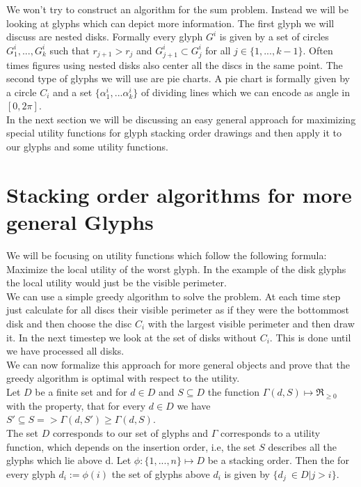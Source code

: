 \documentclass[a4paper,11pt]{article}
\begin{document}
We won't try to construct an algorithm for the sum problem. Instead we will be looking at glyphs which can depict more information. The first glyph we will discuss are nested disks. Formally every glyph $G^i$ is given by a set of circles $G^i_1,...,G^i_k$ such that $r_{j+1}>r_j$ and $G^i_{j+1}\subset G^i_j$ for all $j\in \{1,...,k-1 \}$. Often times figures using nested disks also center all the discs in the same point. The second type of glyphs we will use are pie charts. A pie chart is formally given by a circle $C_i$ and a set $\{\alpha_1^i,...\alpha_k^i\}$ of dividing lines which we can encode as angle in $[0,2\pi ]$.\\
In the next section we will be discussing an easy general approach for maximizing special utility functions for glyph stacking order drawings and then apply it to our glyphs and some utility functions.

\section{Stacking order algorithms for more general Glyphs}

We will be focusing on utility functions which follow the following formula: Maximize the local utility of the worst glyph. In the example of the disk glyphs the local utility would just be the visible perimeter. \\We can use a simple greedy algorithm to solve the problem. At each time step just calculate for all discs their visible perimeter as if they were the bottommost disk and then choose the disc $C_i$ with the largest visible perimeter and then draw it. In the next timestep we look at the set of disks without $C_i$. This is done until we have processed all disks.\\

We can now formalize this approach for more general objects and prove that the greedy algorithm is optimal with respect to the utility.
\\

Let $D$ be a finite set and for $d \in D$ and $S \subseteq D$ the function $ \Gamma(d, S) \mapsto \Re_{\geq 0} $ with the property, that for every $d \in D$ we have $S' \subseteq S => \Gamma(d, S') \geq \Gamma(d, S)$. \\
The set $D$ corresponds to our set of glyphs and $\Gamma$ corresponds to a utility function, which depends on the insertion order, i.e, the set $S$ describes all the glyphs which lie above d. Let $\phi: \{1,...,n\} \mapsto D$ be a stacking order. Then the for every glyph $d_i:=\phi(i)$ the set of glyphs above $d_i$ is given by $\{d_j\ \in D | j > i\}$.
\end{document}
